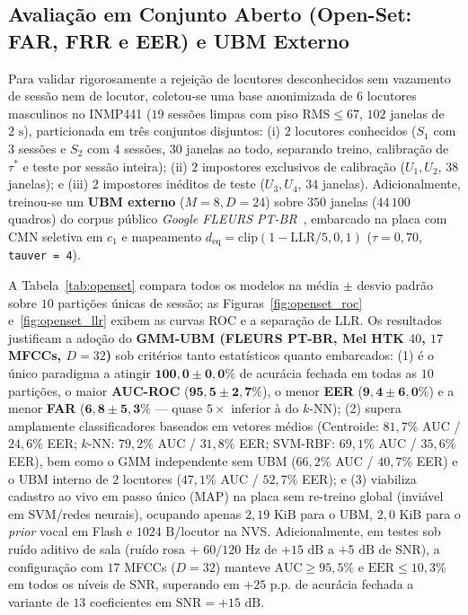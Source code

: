 \documentclass[9pt,technote,a4paper]{IEEEtran}
\begin{document}
\subsection{Avaliação em Conjunto Aberto (Open-Set: FAR, FRR e EER) e UBM Externo}
Para validar rigorosamente a rejeição de locutores desconhecidos sem vazamento de sessão nem de locutor, coletou-se uma base anonimizada de $6$ locutores masculinos no INMP441 ($19$ sessões limpas com piso $\mathrm{RMS} \le 67$, $102$ janelas de $2\text{ s}$), particionada em três conjuntos disjuntos: (i) $2$ locutores conhecidos ($S_1$ com $3$ sessões e $S_2$ com $4$ sessões, $30$ janelas ao todo, separando treino, calibração de $\tau^*$ e teste por sessão inteira); (ii) $2$ impostores exclusivos de calibração ($U_1, U_2$, $38$ janelas); e (iii) $2$ impostores inéditos de teste ($U_3, U_4$, $34$ janelas). Adicionalmente, treinou-se um \textbf{UBM externo} ($M=8, D=24$) sobre $350$ janelas ($44\,100$ quadros) do corpus público \textit{Google FLEURS PT-BR}~\cite{conneau2023}, embarcado na placa com CMN seletiva em $c_1$ e mapeamento $d_{\mathrm{eq}} = \mathrm{clip}(1 - \mathrm{LLR}/5, 0, 1)$ ($\tau = 0{,}70$, \texttt{tauver = 4}).

A Tabela~\ref{tab:openset} compara todos os modelos na média $\pm$ desvio padrão sobre $10$ partições únicas de sessão; as Figuras~\ref{fig:openset_roc} e~\ref{fig:openset_llr} exibem as curvas ROC e a separação de LLR. Os resultados justificam a adoção do \textbf{GMM-UBM (FLEURS PT-BR, Mel HTK $40$, $17$ MFCCs, $D=32$)} sob critérios tanto estatísticos quanto embarcados: (1) é o único paradigma a atingir $\mathbf{100{,}0 \pm 0{,}0\%}$ de acurácia fechada em todas as $10$ partições, o maior \textbf{AUC-ROC} ($\mathbf{95{,}5 \pm 2{,}7\%}$), o menor \textbf{EER} ($\mathbf{9{,}4 \pm 6{,}0\%}$) e a menor \textbf{FAR} ($\mathbf{6{,}8 \pm 5{,}3\%}$ --- quase $5\times$ inferior à do $k$-NN); (2) supera amplamente classificadores baseados em vetores médios (Centroide: $81{,}7\%$ AUC / $24{,}6\%$ EER; $k$-NN: $79{,}2\%$ AUC / $31{,}8\%$ EER; SVM-RBF: $69{,}1\%$ AUC / $35{,}6\%$ EER), bem como o GMM independente sem UBM ($66{,}2\%$ AUC / $40{,}7\%$ EER) e o UBM interno de $2$ locutores ($47{,}1\%$ AUC / $52{,}7\%$ EER); e (3) viabiliza cadastro ao vivo em passo único (MAP) na placa sem re-treino global (inviável em SVM/redes neurais), ocupando apenas $2{,}19\text{ KiB}$ para o UBM, $2{,}0\text{ KiB}$ para o \textit{prior} vocal em Flash e $1024\text{ B}$/locutor na NVS. Adicionalmente, em testes sob ruído aditivo de sala (ruído rosa + $60/120\text{ Hz}$ de $+15\text{ dB}$ a $+5\text{ dB}$ de SNR), a configuração com $17$ MFCCs ($D=32$) manteve $\mathrm{AUC} \ge 95{,}5\%$ e $\mathrm{EER} \le 10{,}3\%$ em todos os níveis de SNR, superando em $+25\text{ p.p.}$ de acurácia fechada a variante de $13$ coeficientes em $\mathrm{SNR} = +15\text{ dB}$.
\end{document}
